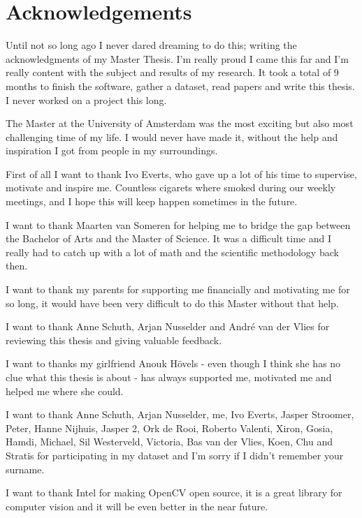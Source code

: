 \documentclass[a4paper, 11pt]{book}
\begin{document}
\tableofcontents{}

\chapter*{Acknowledgements}
Until not so long ago I never dared dreaming to do this; writing the acknowledgments of my Master Thesis. I'm really proud I came this far and I'm really content with the subject and results of my research. It took a total of 9 months to finish the software, gather a dataset, read papers and write this thesis. I never worked on a project this long.

The Master at the University of Amsterdam was the most exciting but also most challenging time of my life. I would never have made it, without the help and inspiration I got from people in my surroundings. 

First of all I want to thank Ivo Everts, who gave up a lot of his time to supervise, motivate and inspire me. Countless cigarets where smoked during our weekly meetings, and I hope this will keep happen sometimes in the future.

I want to thank Maarten van Someren for helping me to bridge the gap between the Bachelor of Arts and the Master of Science. It was a difficult time and I really had to catch up with a lot of math and the scientific methodology back then. 

I want to thank my parents for supporting me financially and motivating me for so long, it would have been very difficult to do this Master without that help.

I want to thank Anne Schuth, Arjan Nusselder and Andr\'{e} van der Vlies for reviewing this thesis and giving valuable feedback.

I want to thanks my girlfriend Anouk H\"{o}vels - even though I think she has no clue what this thesis is about - has always supported me, motivated me and helped me where she could.

I want to thank Anne Schuth, Arjan Nusselder, me, Ivo Everts, Jasper Stroomer, Peter, Hanne Nijhuis, Jasper 2, Ork de Rooi, Roberto Valenti, Xiron, Gosia, Hamdi, Michael, Sil Westerveld, Victoria, Bas van der Vlies, Koen, Chu and Stratis for participating in my dataset and I'm sorry if I didn't remember your surname. 

I want to thank Intel for making OpenCV open source, it is a great library for computer vision and it will be even better in the near future. 
\end{document}
